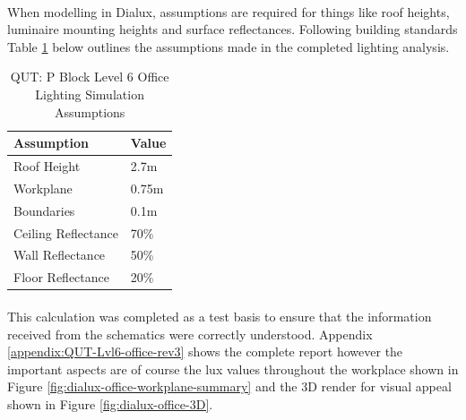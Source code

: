 \paragraph{}
When modelling in Dialux, assumptions are required for things like roof heights, luminaire mounting heights and surface reflectances. Following building standards Table \ref{table:QUT-lvl6-office-assumptions} below outlines the assumptions made in the completed lighting analysis. 

\begin{table}[htb]
	\centering
	\renewcommand{\arraystretch}{2}
	\begin{tabular}{|l|l|}
		\hline
		\textbf{Assumption} & \textbf{Value} \\ \hline
		Roof Height         & 2.7m           \\ \hline
		Workplane           & 0.75m          \\ \hline
		Boundaries          & 0.1m           \\ \hline
		Ceiling Reflectance & 70\%           \\ \hline
		Wall Reflectance    & 50\%           \\ \hline
		Floor Reflectance   & 20\%           \\ \hline
	\end{tabular}
	\caption{QUT: P Block Level 6 Office Lighting Simulation Assumptions}
	\label{table:QUT-lvl6-office-assumptions}
\end{table}  

\paragraph{}
This calculation was completed as a test basis to ensure that the information received from the schematics were correctly understood. Appendix \ref{appendix:QUT-Lvl6-office-rev3} shows the complete report however the important aspects are of course the lux values throughout the workplace shown in Figure \ref{fig:dialux-office-workplane-summary} and the 3D render for visual appeal shown in Figure \ref{fig:dialux-office-3D}.  

